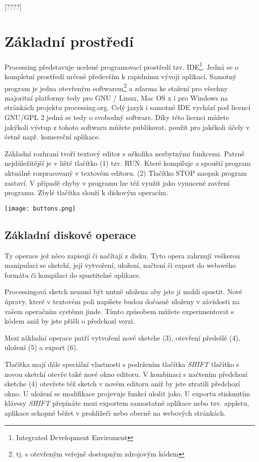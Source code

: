 \documentclass[11pt]{article}
\begin{document}
[????]

\newpage
\section{Základní prostředí}

Processing představuje ucelené programovací prostředí tzv. IDE\footnote{Integrated Development Enviroment}. Jedná se o kompletní prostředí určené především k rapidnímu vývoji aplikací. Samotný program je jedna otevřeným softwarem\footnote{tj. s otevřeným veřejně dostupným zdrojovým kódem} a zdarma ke stažení pro všechny majoritní platformy tedy pro GNU / Linux, Mac OS x i pro Windows na stránkách projektu processing.org. Celý jazyk i samotné IDE vychází pod licencí GNU/GPL 2 jedná se tedy o svobodný software. Díky této licenci můžete jakýkoli výstup z tohoto softwaru můžete publikovat, použit pro jakékoli účely v četně např. komereční aplikace.


Základní rozhraní tvoří textový editor s několika nezbytnými funkcemi. Patrně nejdůležitější je v liště tlačítko (1) tzv. RUN. Které kompiluje a spouští program aktuálně rozpracovaný v textovém editoru. (2) Tlačítko STOP naopak program zastaví. V případě chyby v programu lze též využít jako vynucené zavření programu. Zbylé tlačítka slouží k diskovým operacím. \\


\begin{center}
\texttt{[image: buttons.png]}
\end{center}


\newpage
\subsection{Základní diskové operace}

Ty operace jež něco zapisují či načítají z disku. Tyto opera zahrnují veškerou manipulaci se sketchí, její vytvoření, uložení, načtení či export do webového formátu či kompilaci do spustitelné aplikace.

Processingová sketch nemusí být nutně uložena aby jste ji mohli spustit. Nové úpravy, které v textovém poli napíšete budou dočasně uloženy v závislosti na vašem operačním systému jinde. Tímto způsobem můžete experimentovat s kódem aniž by jste přišli o předchozí verzi.

Mezi základní operace patří vytvoření nové sketche (3), otevření předešlé (4), uložení (5) a export (6).

Tlačítka mají dále speciální vlastnosti s podržením tlačítka {\em SHIFT} tlačítko s novou sketchí otevře také nové okno editoru. V kombinaci s načtením předchozí sketche (4) otevřete též sketch v novém editoru aniž by jste ztratili předchozí okno. U uložení se modifikace projevuje funkcí uložit jako. U exportu stisknutím klávesy {\em SHIFT} přepínáte mezi exportem samostatné aplikace nebo tzv. appletu, aplikace schopné běžet v prohlížeči nebo obecně na webových stránkách.
\end{document}
